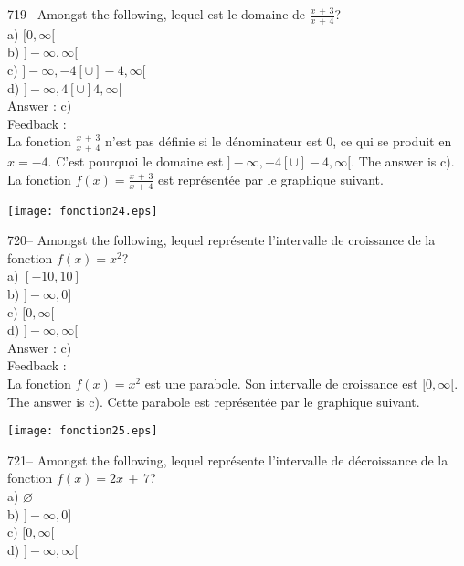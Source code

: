 ﻿\documentclass[letterpaper, 12pt]{article}
\begin{document}
719-- Amongst the following, lequel est le domaine de
$\frac{x\,+\,3}{x\,+\,4}$?\\
a) $[0,\infty[$\\
b) $]-\infty, \infty[$\\
c) $]-\infty,-4[ \cup ]-4,\infty[$\\
d) $]-\infty,4[ \cup ]4,\infty[$\\

Answer : c)\\

Feedback :\\
La fonction $\frac{x\,+\,3}{x\,+\,4}$ n'est pas d\'efinie si le
d\'enominateur est 0, ce qui se produit en $x=-4$.  C'est pourquoi le
domaine est $]-\infty,-4[ \cup ]-4,\infty[$.  The answer is c).  La
fonction $f(x)=\frac{x\,+\,3}{x\,+\,4}$ est repr\'esent\'ee par le graphique
suivant.\\
    \begin{center}
    \texttt{[image: fonction24.eps]}
    \end{center}



720-- Amongst the following, lequel repr\'esente l'intervalle de
croissance de la fonction $f(x)=x^{2}$?\\
a) $[-10,10]$\\
b) $]-\infty,0]$\\
c) $[0,\infty[$\\
d) $]-\infty,\infty[$\\

Answer : c)\\

Feedback : \\
La fonction $f(x)=x^{2}$ est une parabole.  Son intervalle de croissance est
$[0,\infty[$.  The answer is c).  Cette parabole est repr\'esent\'ee par
le graphique suivant.\\
    \begin{center}
    \texttt{[image: fonction25.eps]}
    \end{center}


721-- Amongst the following, lequel repr\'esente l'intervalle de
d\'ecroissance de la fonction $f(x)=2x\,+\,7$?\\
a) $\varnothing$\\
b) $]-\infty,0]$\\
c) $[0,\infty[$\\
d) $]-\infty,\infty[$\\
\end{document}
